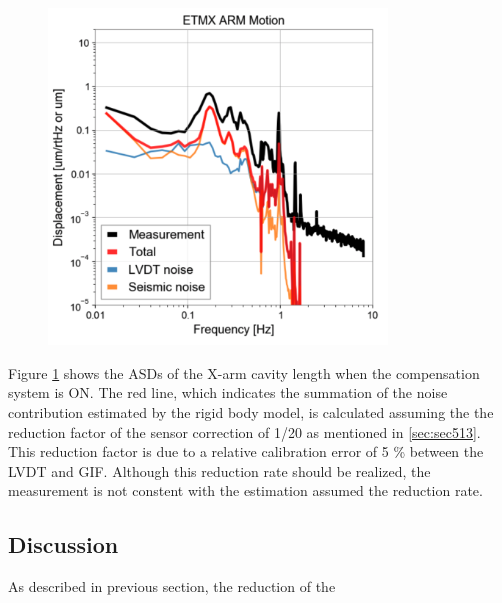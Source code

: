\begin{figure}[h]
  \centering
  \includegraphics[width=9cm]{./img_chap6/img613.png}
  \label{img:img613}
\end{figure}
Figure \ref{img:img613} shows the ASDs of the X-arm cavity length when the compensation system is ON. The red line, which indicates the summation of the noise contribution estimated by the rigid body model, is calculated assuming the the reduction factor of the sensor correction of 1/20 as mentioned in \cref{sec:sec513}. This reduction factor is due to a relative calibration error of 5 \% between the LVDT and GIF. Although this reduction rate should be realized, the measurement is not constent with the estimation assumed the reduction rate.

\subsection{Discussion}
As described in previous section, the reduction of the 

